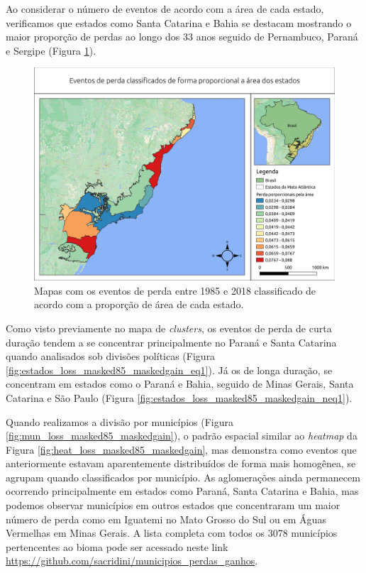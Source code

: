 Ao considerar o número de eventos de acordo com a área de cada estado, verificamos que estados como Santa Catarina e Bahia se destacam mostrando o maior proporção de perdas ao longo dos 33 anos seguido de Pernambuco, Paraná e Sergipe (Figura \ref{fig:estados_loss_proporcional}).

\begin{figure}[H]
    \centering
    \includegraphics[scale=.5]{images/estado_loss_proporcional.pdf}
    \caption{Mapas com os eventos de perda entre 1985 e 2018 classificado de acordo com a proporção de área de cada estado.}
    \label{fig:estados_loss_proporcional}
\end{figure}

Como visto previamente no mapa de \textit{clusters}, os eventos de perda de curta duração tendem a se concentrar principalmente no Paraná e Santa Catarina quando analisados sob divisões políticas (Figura \ref{fig:estados_loss_masked85_maskedgain_eq1}). Já os de longa duração, se concentram em estados como o Paraná e Bahia, seguido de Minas Gerais, Santa Catarina e São Paulo (Figura \ref{fig:estados_loss_masked85_maskedgain_neq1}).

Quando realizamos a divisão por municípios (Figura \ref{fig:mun_loss_masked85_maskedgain}), o padrão espacial similar ao \textit{heatmap} da Figura \ref{fig:heat_loss_masked85_maskedgain}, mas demonstra como eventos que anteriormente estavam aparentemente distribuídos de forma mais homogênea, se agrupam quando classificados por município. As aglomerações ainda permanecem ocorrendo principalmente em estados como Paraná, Santa Catarina e Bahia, mas podemos observar municípios em outros estados que concentraram um maior número de perda como em Iguatemi no Mato Grosso do Sul ou em Águas Vermelhas em Minas Gerais. A lista completa com todos os 3078 municípios pertencentes ao bioma pode ser acessado neste link \url{https://github.com/sacridini/municipios_perdas_ganhos}.

